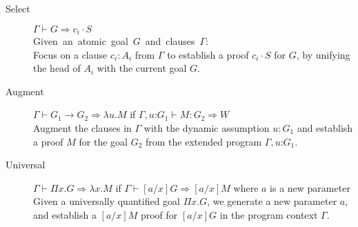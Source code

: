 \documentclass{llncs}
\newcommand{\fighead}{\hrule\vspace{1.5ex}}
\newcommand{\vd}{\vdash}
\newcommand{\arrow}{\rightarrow}
\newcommand{\oftp}{\mathord{:}}
\begin{document}

\begin{small}
\begin{description}
\item[Select] $\Gamma \vd  G \Rightarrow c_i \cdot S$ \\
    \mbox{Given an atomic goal $G$ and clauses $\Gamma$:}\hfill\\
     Focus on a clause $c_i : A_i$ from $\Gamma$ to establish a proof
     $c_i\cdot S$ for $G$, by unifying the head of $A_i$ with the current
     goal $G$. 

\item[Augment] $\Gamma \vd  G_1 \arrow G_2 \Rightarrow \lambda u. M$ if $\Gamma,
  u\oftp G_1 \vd M : G_2 \Rightarrow W$ \\
Augment the clauses in $\Gamma$ with the dynamic assumption $u{:} G_1$ and
establish a proof $M$ for the goal $G_2$ from the extended program
$\Gamma, u \oftp G_1$. 
\item[Universal] $\Gamma \vd  \Pi x. G \Rightarrow \lambda x. M$ if $\Gamma \vd
  [a/x]G\Rightarrow [a/x]M$ where $a$ is a new parameter\\
Given a universally quantified goal $\Pi x. G$, we generate a new parameter $a$, and establish a $[a/x]M$ proof  for $[a/x]G$ in the program context $\Gamma$.
\end{description}
\end{small}    
\end{document}
